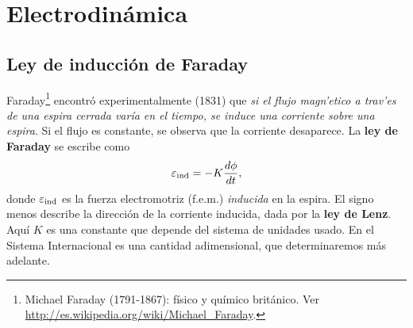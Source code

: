\chapter{Electrodinámica}

\section{Ley de inducción de Faraday}

Faraday\footnote{Michael Faraday (1791-1867): físico y químico británico. Ver \url{http://es.wikipedia.org/wiki/Michael_Faraday}.} encontró experimentalmente (1831) que \textit{si el flujo magn'etico a trav'es de una espira cerrada varía en el tiempo, se induce una corriente sobre una espira}. Si el flujo es constante, se observa que la corriente desaparece. La \textbf{ley de Faraday} se escribe como
\begin{equation}\label{faraday}
\varepsilon_{\rm ind}=-K\frac{d\phi}{dt},
\end{equation}
donde $\varepsilon_{\rm ind}$ es la fuerza electromotriz (f.e.m.) \textit{inducida} en la espira. El signo menos describe la dirección de la corriente inducida, dada por la \textbf{ley de Lenz}. Aquí $K$ es una constante que depende del sistema de unidades usado. En el Sistema Internacional es una cantidad adimensional, que determinaremos más adelante.

